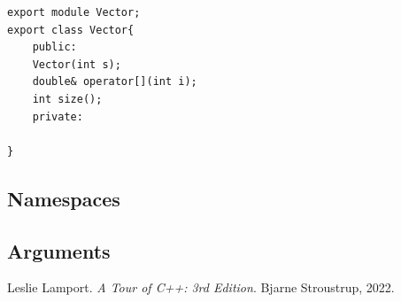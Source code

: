 \documentclass[a4paper, 10pt]{article}
\begin{document}
\begin{lstlisting}[style=cpp]
export module Vector;
export class Vector{
    public:
    Vector(int s);
    double& operator[](int i);
    int size();
    private:

}
\end{lstlisting}

\subsection{Namespaces}
\subsection{Arguments}

\begin{thebibliography}{9}
	Leslie Lamport.
	\textit{A Tour of C++: 3rd Edition}.
	Bjarne Stroustrup, 2022.

\end{thebibliography}
\end{document}
